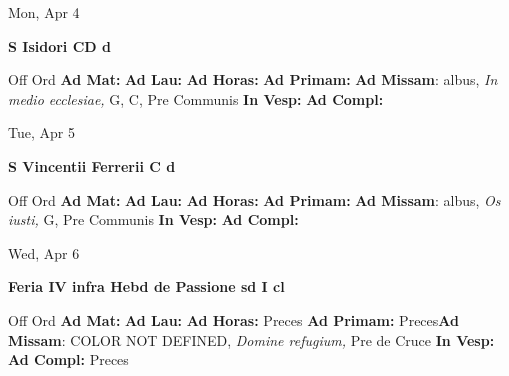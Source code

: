 \documentclass[10pt]{memoir}
\begin{document}
\begin{center}
\begin{minipage}{3.5in}
\vspace{2em}
\begin{center}Mon, Apr 4
\end{center}
\textbf{ \large S Isidori CD
\textnormal{\normalsize d}}

\begin{justify}Off Ord
\textbf{Ad Mat: }
\textbf{Ad Lau: }
\textbf{Ad Horas: }
\textbf{Ad Primam: }\textbf{Ad Missam}: albus, \textit{In medio ecclesiae,} G, C, Pre Communis
\textbf{In Vesp: }
\textbf{Ad Compl: }
\end{justify}
\end{minipage}
\end{center}

\begin{center}
\begin{minipage}{3.5in}
\vspace{2em}
\begin{center}Tue, Apr 5
\end{center}
\textbf{ \large S Vincentii Ferrerii C
\textnormal{\normalsize d}}

\begin{justify}Off Ord
\textbf{Ad Mat: }
\textbf{Ad Lau: }
\textbf{Ad Horas: }
\textbf{Ad Primam: }\textbf{Ad Missam}: albus, \textit{Os iusti,} G, Pre Communis
\textbf{In Vesp: }
\textbf{Ad Compl: }
\end{justify}
\end{minipage}
\end{center}

\begin{center}
\begin{minipage}{3.5in}
\vspace{2em}
\begin{center}Wed, Apr 6
\end{center}
\textbf{ \large Feria IV infra Hebd de Passione
\textnormal{\normalsize sd I cl}}

\begin{justify}Off Ord
\textbf{Ad Mat: }
\textbf{Ad Lau: }
\textbf{Ad Horas: }Preces
\textbf{Ad Primam: }Preces\textbf{Ad Missam}: COLOR NOT DEFINED, \textit{Domine refugium,} Pre de Cruce
\textbf{In Vesp: }
\textbf{Ad Compl: }Preces
\end{justify}
\end{minipage}
\end{center}
\end{document}
